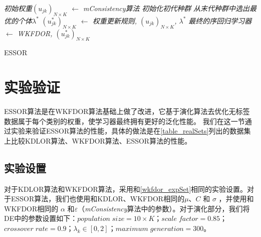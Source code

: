 \IncMargin{1em}
\begin{algorithm}
\emph{初始权重$(u_{jk})_{N \times K}$ $\leftarrow$ \textit{mConsistency}算法}\;
\emph{初始化初代种群}\;
\emph{从末代种群中选出最优的个体$\lambda^{*}$}\;
\emph{$(u_{jk}^{*})_{N \times K}$ $\leftarrow$ 权重更新规则, $(u_{jk})_{N \times K}$, $\lambda^{*}$}\;
\emph{最终的序回归学习器 $\leftarrow$ WKFDOR, $(u_{jk}^{*})_{N \times K}$}\;
\caption{ESSOR}\label{alg_ESSOR}
\end{algorithm}\DecMargin{1em}

\section{实验验证}
ESSOR算法是在WKFDOR算法基础上做了改进，它基于演化算法去优化无标签数据属于每个类别的权重，使学习器最终拥有更好的泛化性能。 我们在这一节通过实验来验证ESSOR算法的性能，具体的做法是在\autoref{table_realSets}列出的数据集上比较KDLOR算法、WKFDOR算法、ESSOR算法的性能。

\subsection{实验设置}
对于KDLOR算法和WKFDOR算法，采用和\autoref{wkfdor_expSet}相同的实验设置。对于ESSOR算法，我们也使用和KDLOR、WKFDOR相同的\(\mu\)、\(C\) 和 \(\sigma\) ，并使用和WKFDOR相同的 \(\alpha\) 和\(\varepsilon\)（\textit{mConsistency}算法中的参数）。对于演化部分，我们将DE中的参数设置如下：\(population\;size = 10 \times K\)；\(scale\;factor = 0.85\)；\(crossover\;rate=0.9\)；\(\lambda_{k} \in [0,2]\)；\(maximum\;generation = 300\)。

